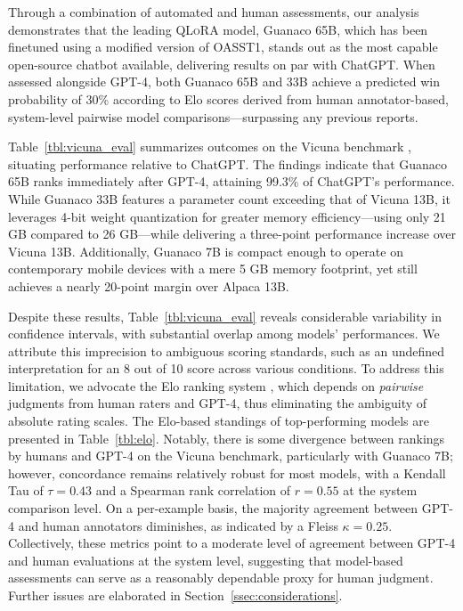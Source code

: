 Through a combination of automated and human assessments, our analysis demonstrates that the leading \textsc{QLoRA} model, {Guanaco} 65B, which has been finetuned using a modified version of OASST1, stands out as the most capable open-source chatbot available, delivering results on par with ChatGPT. When assessed alongside GPT-4, both {Guanaco} 65B and 33B achieve a predicted win probability of 30\% according to Elo scores derived from human annotator-based, system-level pairwise model comparisons—surpassing any previous reports.

Table~\ref{tbl:vicuna_eval} summarizes outcomes on the Vicuna benchmark \cite{vicuna2023}, situating performance relative to ChatGPT. The findings indicate that {Guanaco} 65B ranks immediately after GPT-4, attaining 99.3\% of ChatGPT’s performance. While {Guanaco} 33B features a parameter count exceeding that of Vicuna 13B, it leverages 4-bit weight quantization for greater memory efficiency—using only 21 GB compared to 26 GB—while delivering a three-point performance increase over Vicuna 13B. Additionally, {Guanaco} 7B is compact enough to operate on contemporary mobile devices with a mere 5 GB memory footprint, yet still achieves a nearly 20-point margin over Alpaca 13B.

Despite these results, Table~\ref{tbl:vicuna_eval} reveals considerable variability in confidence intervals, with substantial overlap among models’ performances. We attribute this imprecision to ambiguous scoring standards, such as an undefined interpretation for an 8 out of 10 score across various conditions. To address this limitation, we advocate the Elo ranking system \citep{elo1967proposed}, which depends on \textit{pairwise} judgments from human raters and GPT-4, thus eliminating the ambiguity of absolute rating scales. The Elo-based standings of top-performing models are presented in Table~\ref{tbl:elo}. Notably, there is some divergence between rankings by humans and GPT-4 on the Vicuna benchmark, particularly with Guanaco 7B; however, concordance remains relatively robust for most models, with a Kendall Tau of $\tau=0.43$ and a Spearman rank correlation of $r=0.55$ at the system comparison level. On a per-example basis, the majority agreement between GPT-4 and human annotators diminishes, as indicated by a Fleiss $\kappa=0.25$. Collectively, these metrics point to a moderate level of agreement between GPT-4 and human evaluations at the system level, suggesting that model-based assessments can serve as a reasonably dependable proxy for human judgment. Further issues are elaborated in Section~\ref{ssec:considerations}.

